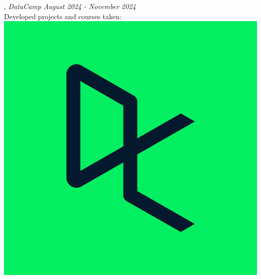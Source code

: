 , \textit{DataCamp \hfill	August 2024 - November 2024}
\\ \hspace{0.3 cm}  Developed projects and courses taken:\hspace{0.1 cm} \href{https://www.datacamp.com/portfolio/juanjogervasio}{\includegraphics[scale=0.008]{datacamp.jpg}}
